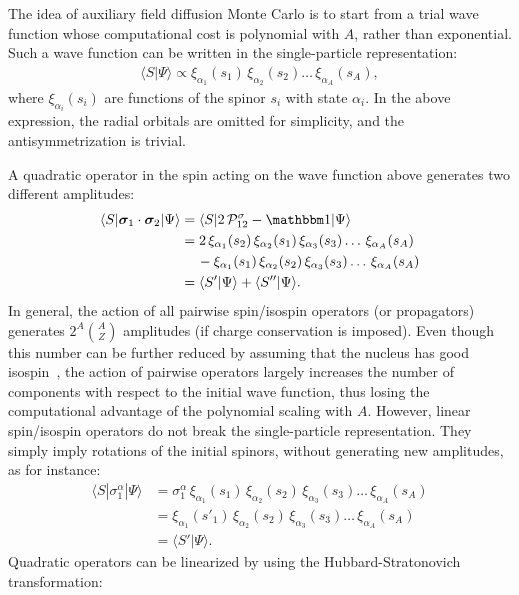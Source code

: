 \documentclass[aps,prc,twocolumn,superscriptaddress,floatfix]{revtex4-1}
\begin{document}
The idea of auxiliary field diffusion Monte Carlo is to start from a trial wave function
whose computational cost is polynomial with $A$, rather than exponential.
Such a wave function can be written in the single-particle representation:
\begin{align}
\langle S|\Psi\rangle\propto\xi_{\alpha_1}(s_1)\,\xi_{\alpha_2}(s_2)\dots\,\xi_{\alpha_A}(s_A) ,
\label{eq:wf_s}
\end{align}
where $\xi_{\alpha_i}(s_i)$ are functions of the spinor $s_i$ with state $\alpha_i$. 
In the above expression, the radial orbitals are omitted for simplicity, 
and the antisymmetrization is trivial.

A quadratic operator in the spin acting on the wave function above generates two different amplitudes:
\begin{align}
\langle S|\bm\sigma_1\cdot\bm\sigma_2|\Psi\rangle & =\langle S|2\,\mathcal P_{12}^\sigma-\mathbbm1|\Psi\rangle \nonumber \\
& =2\,\xi_{\alpha_1}(s_2)\,\xi_{\alpha_2}(s_1)\,\xi_{\alpha_3}(s_3)\dots\,\xi_{\alpha_A}(s_A) \nonumber \\
& \quad\,-\xi_{\alpha_1}(s_1)\,\xi_{\alpha_2}(s_2)\,\xi_{\alpha_3}(s_3)\dots\,\xi_{\alpha_A}(s_A) \nonumber \\
& =\langle S'|\Psi\rangle+\langle S''|\Psi\rangle .
\end{align}
In general, the action of all pairwise spin/isospin operators (or propagators) generates $2^A\binom{A}{Z}$ 
amplitudes (if charge conservation is imposed). Even though this number can be further reduced by 
assuming that the nucleus has good isospin~\cite{Carlson:2015}, the action of pairwise operators 
largely increases the number of components with respect to the initial wave function, thus losing the 
computational advantage of the polynomial scaling with $A$.
However, linear spin/isospin operators do not break the single-particle representation. 
They simply imply rotations of the initial spinors, without generating new amplitudes, as for instance:
\begin{align}
\langle S|\sigma_1^\alpha|\Psi\rangle &=
\sigma_1^\alpha\,\xi_{\alpha_1}(s_1)\,\xi_{\alpha_2}(s_2)\,\xi_{\alpha_3}(s_3)\dots\,\xi_{\alpha_A}(s_A) \nonumber \\
& =\xi_{\alpha_1}(s'_1)\,\xi_{\alpha_2}(s_2)\,\xi_{\alpha_3}(s_3)\dots\,\xi_{\alpha_A}(s_A) \nonumber \\
& =\langle S'|\Psi\rangle .
\end{align}
Quadratic operators can be linearized by using the Hubbard-Stratonovich transformation:
\end{document}
